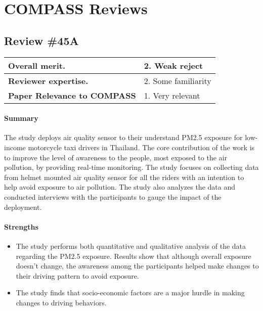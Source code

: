 \clearpage
\section*{COMPASS Reviews}
\subsection{Review \#45A}
\begin{table}[h]
\begin{tabular}{|l|l|}
    \hline
    \textbf{Overall merit.} &
    2. Weak reject \\
    \hline
    \textbf{Reviewer expertise.} &
    2. Some familiarity \\
    \hline
    \textbf{Paper Relevance to COMPASS} &
    1. Very relevant \\
    \hline
\end{tabular}
\end{table}

\paragraph{Summary}
The study deploys air quality sensor to their understand PM2.5 exposure for low-income motorcycle taxi drivers in Thailand. The core contribution of the work is to improve the level of awareness to the people, most exposed to the air pollution, by providing real-time monitoring. The study focuses on collecting data from helmet mounted air quality sensor for all the riders with an intention to help avoid exposure to air pollution. The study also analyzes the data and conducted interviews with the participants to gauge the impact of the deployment.

\paragraph{Strengths}
\begin{itemize}
\item 
The study performs both quantitative and qualitative analysis of the data regarding the PM2.5 exposure. Results show that although overall exposure doesn’t change, the awareness among the participants helped make changes to their driving pattern to avoid exposure.
\item
The study finds that socio-economic factors are a major hurdle in making changes to driving behaviors.
\end{itemize}

